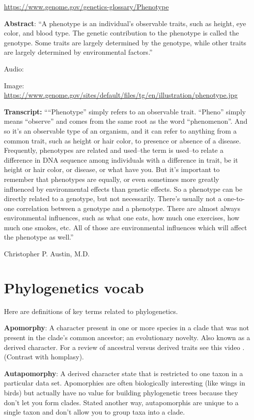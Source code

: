 \documentclass[
]{book}
\begin{document}
\url{https://www.genome.gov/genetics-glossary/Phenotype}

\textbf{Abstract}: ``A phenotype is an individual's observable traits, such as height, eye color, and blood type. The genetic contribution to the phenotype is called the genotype. Some traits are largely determined by the genotype, while other traits are largely determined by environmental factors.''

Audio:

Image: \url{https://www.genome.gov/sites/default/files/tg/en/illustration/phenotype.jpg}

\textbf{Transcript:} ````Phenotype'' simply refers to an observable trait. ``Pheno'' simply means ``observe'' and comes from the same root as the word ``phenomenon''. And so it's an observable type of an organism, and it can refer to anything from a common trait, such as height or hair color, to presence or absence of a disease. Frequently, phenotypes are related and used--the term is used--to relate a difference in DNA sequence among individuals with a difference in trait, be it height or hair color, or disease, or what have you. But it's important to remember that phenotypes are equally, or even sometimes more greatly influenced by environmental effects than genetic effects. So a phenotype can be directly related to a genotype, but not necessarily. There's usually not a one-to-one correlation between a genotype and a phenotype. There are almost always environmental influences, such as what one eats, how much one exercises, how much one smokes, etc. All of those are environmental influences which will affect the phenotype as well.''

Christopher P. Austin, M.D.

\hypertarget{phylogenetics-vocab}{%
\section{Phylogenetics vocab}\label{phylogenetics-vocab}}

Here are definitions of key terms related to phylogenetics.

\textbf{Apomorphy}: A character present in one or more species in a clade that was not present in the clade's common ancestor; an evolutionary novelty. Also known as a derived character. For a review of ancestral versus derived traits see this video . (Contrast with homplasy).

\textbf{Autapomorphy}: A derived character state that is restricted to one taxon in a particular data set. Apomorphies are often biologically interesting (like wings in birds) but actually have no value for building phylogenetic trees because they don't let you form clades. Stated another way, autapomorphis are unique to a single taxon and don't allow you to group taxa into a clade.
\end{document}
